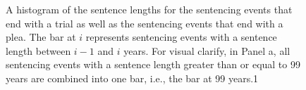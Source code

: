 \documentclass[11pt, oneside]{article}   	%
\theoremstyle{ModifiedStyle}
\begin{document}
%
\begin{figure}[h!]
	\centering\captionsetup[subfloat]{labelfont=up,font=small}
	\centering
	\hspace*{-8mm}
	\caption{A histogram of the sentence lengths for the sentencing events that end with a trial as well as the sentencing events that end with a plea. The bar at $i$ represents sentencing events with a sentence length between $i-1$ and $i$ years. For visual clarify, in Panel a, all sentencing events with a sentence length greater than or equal to 99 years are combined into one bar, i.e., the bar at 99 years.1 }
	\label{Figure_Hester_Sentence_Length_Given_Trial_And_Plea_Histogram}
\end{figure}
\end{document}
